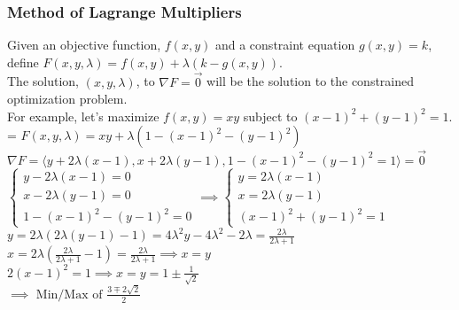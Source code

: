 \subsubsection{Method of Lagrange Multipliers}
\noindent
Given an objective function, $f(x,y)$ and a constraint equation $g(x,y) = k$, define $F(x,y,\lambda) = f(x,y) + \lambda(k-g(x,y))$.\\
The solution, $(x, y, \lambda)$, to $\nabla F = \vec{0}$ will be the solution to the constrained optimization problem.\\

\noindent
For example, let's maximize $f(x,y)=xy$ subject to $(x-1)^2 + (y-1)^2 = 1$.\\
\indent=
$F(x,y,\lambda) = xy + \lambda(1 - (x-1)^2 - (y-1)^2)$\\
\indent
$\nabla F = \langle y + 2\lambda(x-1), x+2\lambda(y-1), 1 - (x-1)^2 - (y-1)^2 = 1 \rangle = \vec{0}$\\
\indent
$
\begin{cases}
	y - 2\lambda(x-1) = 0 \\ 
	x - 2\lambda(y-1) = 0 \\ 
	1 - (x-1)^2 - (y-1)^2 = 0
\end{cases}
\implies \begin{cases}
	y = 2\lambda(x-1) \\ 
	x = 2\lambda(y-1) \\ 
	(x-1)^2 + (y-1)^2 = 1
\end{cases}$\\
\indent
$y = 2\lambda(2\lambda(y-1) - 1) = 4\lambda^2 y - 4\lambda^2 - 2\lambda = \frac{2\lambda}{2\lambda+1}$\\
\indent
$x = 2\lambda\left(\frac{2\lambda}{2\lambda+1} - 1\right) = \frac{2\lambda}{2\lambda+1} \implies x = y$\\
\indent
$2(x-1)^2 = 1 \implies x = y = 1 \pm \frac{1}{\sqrt{2}}$\\
\indent
$\implies \text{ Min/Max of } \frac{3 \mp 2\sqrt{2}}{2}$\\